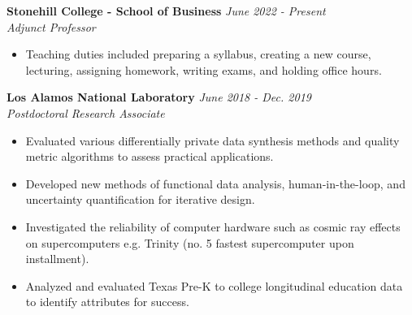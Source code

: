 \documentclass[11pt, letterpaper, roman]{moderncv} %
\newcommand{\workspace}{\vspace{3pt}}
\begin{document}
\workspace

\textbf{Stonehill College - School of Business} \hfill \textit{June 2022 - Present}\\
\textit{Adjunct Professor}
\begin{itemize}
    \item Teaching duties included preparing a syllabus, creating a new course, lecturing, assigning homework, writing exams, and holding office hours.
\end{itemize}

\workspace 

\textbf{Los Alamos National Laboratory} \hfill \textit{June 2018 - Dec. 2019}\\
\textit{Postdoctoral Research Associate}
\begin{itemize}
        \item Evaluated various differentially private data synthesis methods and quality metric algorithms to assess practical applications.
        \item Developed new methods of functional data analysis, human-in-the-loop, and uncertainty quantification for iterative design.
        \item Investigated the reliability of computer hardware such as cosmic ray effects on supercomputers e.g. Trinity (no. 5 fastest supercomputer upon installment).
        \item Analyzed and evaluated Texas Pre-K to college longitudinal education data to identify attributes for success.
\end{itemize}


\end{document}
